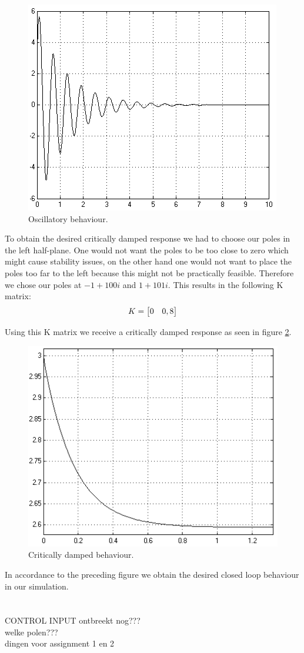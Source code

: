 \documentclass[final]{scrreprt} %
\begin{document}
\begin{figure}[h!]
\centering
\includegraphics[scale = 0.5]{res/osc2-res.png}
\caption{Oscillatory behaviour.}
\label{fig:oscillatory}
\end{figure}

To obtain the desired critically damped response we had to choose our poles in the left half-plane. One would not want the poles to be too close to zero which might cause stability issues, on the other hand one would not want to place the poles too far to the left because this might not be practically feasible. Therefore we chose our poles at $-1+100i$ and $1+101i$. This results in the following K matrix:
\begin{equation}
\centering
K =
\begin{bmatrix}
  0 & 0,8
\end{bmatrix}
\end{equation}

Using this K matrix we receive a critically damped response as seen in figure \ref{fig:critically}.

\begin{figure}[H]
\centering
\includegraphics[scale = 0.5]{res/critically-res.png}
\caption{Critically damped behaviour.}
\label{fig:critically}
\end{figure}

In accordance to the preceding figure we obtain the desired closed loop behaviour in our simulation.\\\\
\\
CONTROL INPUT ontbreekt nog???\\
welke polen???\\
dingen voor assignment 1 en 2\\
\end{document}

